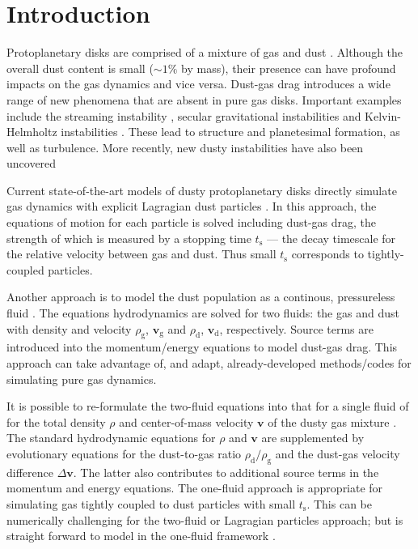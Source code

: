 \documentclass[iop, numberedappendix]{emulateapj}
\newcommand{\rhod}{\rho_\mathrm{d}}
\newcommand{\rhog}{\rho_\mathrm{g}}
\newcommand{\tstop}{t_\mathrm{s}}
\begin{document}
\section{Introduction}
Protoplanetary disks are comprised of a mixture of gas and dust
\citep{chiang10}. Although the overall dust content is small
($\sim 1\%$ by mass), their presence can have profound impacts on the 
gas dynamics and vice versa. Dust-gas drag introduces a 
wide range of new phenomena that are absent in pure gas
disks. Important examples include the streaming instability
\citep{youdin05a,youdin07b,johansen07}, secular gravitational
instabilities \citep{ward00,youdin11,michikoshi12,takahashi14} and
Kelvin-Helmholtz instabilities
\citep{chiang08,barranco09,lee10}. These lead to structure and
planetesimal formation, as well as turbulence. More recently, new
dusty instabilities have also been uncovered
\citep{loren15,loren16,lamb16}  


Current state-of-the-art models of dusty protoplanetary
disks directly simulate gas dynamics with explicit
Lagragian dust particles \citep{nelson10,bai10,johansen11,yang14,zhu14,gibbons15,simon16,baruteau16}. In this
approach, the equations of motion for each particle is solved
including dust-gas drag, the strength of which is measured 
by a stopping time $\tstop$ --- the decay timescale for the 
relative velocity between gas and dust. Thus small $\tstop$
corresponds to tightly-coupled particles. 


Another approach is to model the dust population as a continous, pressureless
fluid
\citep{paardekooper06b,meheut12,laibe12,loren14,fu14b,surville16}. The equations
hydrodynamics are solved for two fluids: the gas and dust with density and
velocity $\rhog$, $\bm{v}_\mathrm{g}$ and $\rhod$,
$\bm{v}_\mathrm{d}$, respectively. Source terms are introduced into
the momentum/energy equations to model dust-gas drag. This approach
can take advantage of, and adapt, already-developed methods/codes for
simulating pure gas dynamics. 


It is possible to re-formulate the two-fluid equations into that for a
single fluid of for the total density $\rho$ and center-of-mass
velocity $\bm{v}$ of the dusty gas mixture
\citep{laibe14}. The standard hydrodynamic equations for
$\rho$ and $\bm{v}$ are supplemented by evolutionary equations for
the dust-to-gas ratio $\rhod/\rhog$ and the dust-gas velocity
difference $\Delta\bm{v}$. The latter also contributes to
additional source terms in the momentum and energy equations.  
The one-fluid approach is appropriate for 
simulating gas tightly coupled to dust particles with small $\tstop$.  
This can be numerically challenging for the two-fluid or Lagragian
particles approach; but is straight forward to model in the
one-fluid framework \citep{price15}.  
\end{document}
